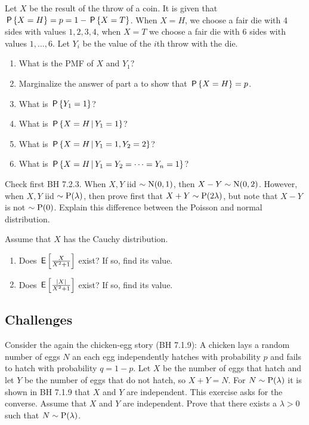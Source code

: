 \documentclass[assignments]{subfiles}
\begin{document}
\begin{exercise}
Let $X$ be the result of the throw of a coin.
It is given that $\P{X=H} = p = 1-\P{X=T}$.
When $X=H$, we choose a fair die with 4 sides with values $1,2,3,4$, when $X=T$ we choose a fair die with 6 sides with values $1,\ldots,6$.
Let $Y_i$ be the value of the $i$th throw with the die.
\begin{enumerate}
\item What is the PMF of $X$ and $Y_1$?
\item Marginalize  the answer of part a to show that $\P{X=H} = p$. 
\item What is $\P{Y_{1}=1}$?
\item What is $\P{X=H \given Y_1=1}$?
\item What is $\P{X=H \given Y_1=1, Y_2=2}$?
\item What is $\P{X=H \given Y_1=Y_2=\cdots=Y_n = 1}$?
\end{enumerate}
\end{exercise}


\begin{exercise}
Check first BH 7.2.3.
When $X, Y$ iid $\sim \Norm{0, 1}$, then $X-Y\sim\Norm{0,2}$.
However, when $X, Y$ iid $\sim \Pois{\lambda}$, then prove first that $X+Y\sim \Pois{2\lambda}$, but note that $X-Y$ is not $\sim\Pois{0}$.
Explain this difference between the Poisson and normal distribution.
\end{exercise}


\begin{exercise} %
Assume that $X$ has the Cauchy distribution. 
\begin{enumerate}
\item Does $\E{\frac{X}{X^2+1}}$ exist? If so, find its value. 
\item Does $\E{\frac{|X|}{X^2+1}}$ exist? If so, find its value. 
\end{enumerate}
\end{exercise}


\subsection{Challenges}
\label{sec:above-exam-level}

\begin{exercise} %
Consider the again the chicken-egg story (BH 7.1.9): A chicken lays a random number of eggs $N$ an each egg independently hatches with probability $p$ and fails to hatch with probability $q = 1-p$. Let $X$ be the number of eggs that hatch and let $Y$ be the number of eggs that do not hatch, so $X+Y = N$. 
For $N \sim \Pois{\lambda}$ it is shown in BH 7.1.9 that $X$ and $Y$ are independent. This exercise asks for the converse. Assume that $X$ and $Y$ are independent. Prove that there exists a $\lambda > 0$ such that $N \sim \Pois{\lambda}$.
\end{exercise}
\end{document}
